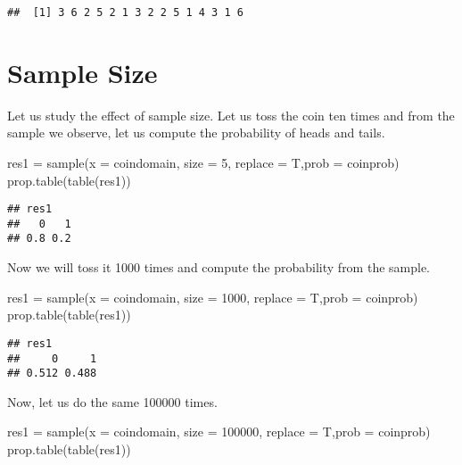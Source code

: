 \documentclass[
]{article}
\newenvironment{Shaded}{\begin{snugshade}}{\end{snugshade}}
\newcommand{\AttributeTok}[1]{\textcolor[rgb]{0.77,0.63,0.00}{#1}}
\newcommand{\DecValTok}[1]{\textcolor[rgb]{0.00,0.00,0.81}{#1}}
\newcommand{\FunctionTok}[1]{\textcolor[rgb]{0.00,0.00,0.00}{#1}}
\newcommand{\NormalTok}[1]{#1}
\newcommand{\OtherTok}[1]{\textcolor[rgb]{0.56,0.35,0.01}{#1}}
\begin{document}
\begin{verbatim}
##  [1] 3 6 2 5 2 1 3 2 2 5 1 4 3 1 6
\end{verbatim}

\hypertarget{sample-size}{%
\section{Sample Size}\label{sample-size}}

Let us study the effect of sample size. Let us toss the coin ten times
and from the sample we observe, let us compute the probability of heads
and tails.

\begin{Shaded}
\begin{Highlighting}[]
\NormalTok{res1 }\OtherTok{=} \FunctionTok{sample}\NormalTok{(}\AttributeTok{x =}\NormalTok{ coindomain, }\AttributeTok{size =} \DecValTok{5}\NormalTok{, }\AttributeTok{replace =}\NormalTok{ T,}\AttributeTok{prob =}\NormalTok{ coinprob)}
\FunctionTok{prop.table}\NormalTok{(}\FunctionTok{table}\NormalTok{(res1))}
\end{Highlighting}
\end{Shaded}

\begin{verbatim}
## res1
##   0   1 
## 0.8 0.2
\end{verbatim}

Now we will toss it 1000 times and compute the probability from the
sample.

\begin{Shaded}
\begin{Highlighting}[]
\NormalTok{res1 }\OtherTok{=} \FunctionTok{sample}\NormalTok{(}\AttributeTok{x =}\NormalTok{ coindomain, }\AttributeTok{size =} \DecValTok{1000}\NormalTok{, }\AttributeTok{replace =}\NormalTok{ T,}\AttributeTok{prob =}\NormalTok{ coinprob)}
\FunctionTok{prop.table}\NormalTok{(}\FunctionTok{table}\NormalTok{(res1))}
\end{Highlighting}
\end{Shaded}

\begin{verbatim}
## res1
##     0     1 
## 0.512 0.488
\end{verbatim}

Now, let us do the same 100000 times.

\begin{Shaded}
\begin{Highlighting}[]
\NormalTok{res1 }\OtherTok{=} \FunctionTok{sample}\NormalTok{(}\AttributeTok{x =}\NormalTok{ coindomain, }\AttributeTok{size =} \DecValTok{100000}\NormalTok{, }\AttributeTok{replace =}\NormalTok{ T,}\AttributeTok{prob =}\NormalTok{ coinprob)}
\FunctionTok{prop.table}\NormalTok{(}\FunctionTok{table}\NormalTok{(res1))}
\end{Highlighting}
\end{Shaded}
\end{document}
